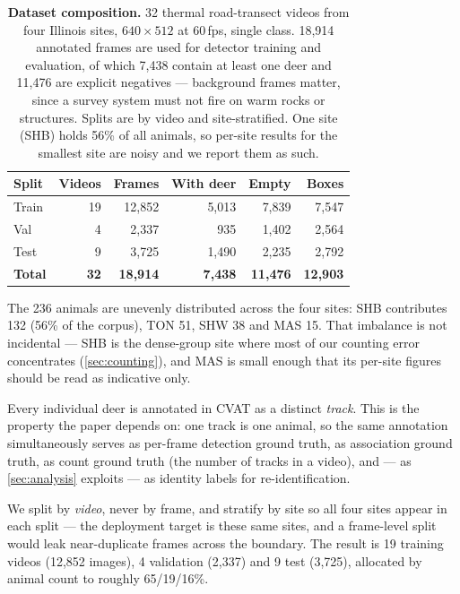 \begin{table}[t]
\centering\small
\setlength{\tabcolsep}{4pt}
\begin{tabular}{lrrrrr}
\toprule
Split & Videos & Frames & With deer & Empty & Boxes \\
\midrule
Train & 19 & 12,852 & 5,013 & 7,839 & 7,547 \\
Val   &  4 &  2,337 &   935 & 1,402 & 2,564 \\
Test  &  9 &  3,725 & 1,490 & 2,235 & 2,792 \\
\midrule
\textbf{Total} & \textbf{32} & \textbf{18,914} & \textbf{7,438} & \textbf{11,476} & \textbf{12,903} \\
\bottomrule
\end{tabular}
\caption{\textbf{Dataset composition.} 32 thermal road-transect videos from four Illinois
sites, $640\times512$ at 60\,fps, single class. 18,914 annotated frames are used for
detector training and evaluation, of which 7,438 contain at least one deer and 11,476 are
explicit negatives --- background frames matter, since a survey system must not fire on warm
rocks or structures. Splits are by video and site-stratified. One site (SHB) holds 56\% of
all animals, so per-site results for the smallest site are noisy and we report them as
such.}
\label{tab:dataset}
\end{table}

The 236 animals are unevenly distributed across the four sites: SHB contributes 132
(56\% of the corpus), TON 51, SHW 38 and MAS 15. That imbalance is not incidental --- SHB
is the dense-group site where most of our counting error concentrates (\cref{sec:counting}),
and MAS is small enough that its per-site figures should be read as indicative only.

Every individual deer is annotated in CVAT as a distinct \emph{track}. This is the property
the paper depends on: one track is one animal, so the same annotation simultaneously serves
as per-frame detection ground truth, as association ground truth, as count ground truth
(the number of tracks in a video), and --- as \cref{sec:analysis} exploits --- as identity
labels for re-identification.

We split by \emph{video}, never by frame, and stratify by site so all four sites appear in
each split --- the deployment target is these same sites, and a frame-level split would leak
near-duplicate frames across the boundary. The result is 19 training videos (12,852 images),
4 validation (2,337) and 9 test (3,725), allocated by animal count to roughly
65/19/16\%.

